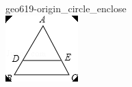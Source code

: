 \documentclass[12pt]{article}
\begin{document}
\begin{center}
\begin{minipage}{0.32\textwidth}
\end{minipage}
\hfill\begin{minipage}{0.32\textwidth}\centering
geo619-origin\_circle\_enclose\\
\includegraphics[width=0.95\linewidth]{out_rommath_origin/items/geo619-origin/assets/figure_circle.png}
\end{minipage}
\par
\end{center}
\bigskip
\end{document}
